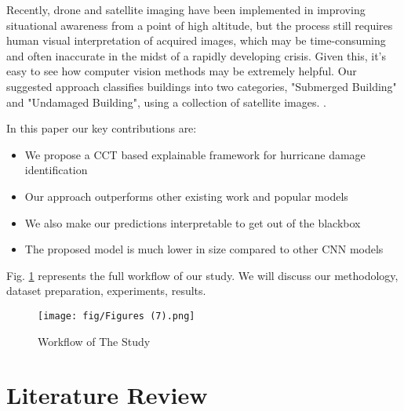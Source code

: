 \documentclass[conference]{IEEEtran}
\begin{document}
Recently, drone and satellite imaging have been implemented in improving situational awareness from a point of high altitude, but the process still requires human visual interpretation of acquired images, which may be time-consuming and often inaccurate in the midst of a rapidly developing crisis. Given this, it's easy to see how computer vision methods may be extremely helpful. Our suggested approach classifies buildings into two categories, "Submerged Building" and "Undamaged Building", using a collection of satellite images. \cite{cao_building_2020}.

In this paper our key contributions are:

\begin{itemize}
    \item We propose a CCT based explainable framework for hurricane damage identification
    \item Our approach outperforms other existing work and  popular models
    \item We also make our predictions interpretable to get out of the blackbox
    \item The proposed model is much lower in size compared to other CNN models
\end{itemize}

Fig. \ref{work_fig} represents the full workflow of our study. We will discuss our methodology, dataset preparation, experiments, results.

\begin{figure}[htbp]
\centering
\centerline{\texttt{[image: fig/Figures (7).png]}}
\caption{Workflow of The Study}
\label{work_fig}
\end{figure}


\section{Literature Review}
\end{document}
